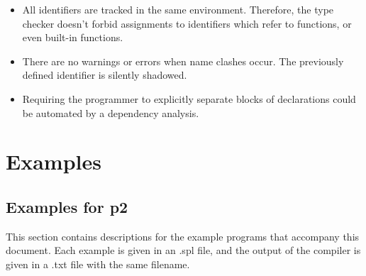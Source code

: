 \documentclass[a4paper]{article}
\begin{document}
\begin{itemize}

  \item All identifiers are tracked in the same environment.  Therefore, the
  type checker doesn't forbid assignments to identifiers which refer to
  functions, or even built-in functions.

  \item There are no warnings or errors when name clashes occur.  The previously
  defined identifier is silently shadowed.

  \item Requiring the programmer to explicitly separate blocks of declarations
  could be automated by a dependency analysis.

\end{itemize}


\section{Examples}

\subsection{Examples for p2}

This section contains descriptions for the example programs that accompany this
document.  Each example is given in an .spl file, and the output of the compiler
is given in a .txt file with the same filename.
\end{document}
